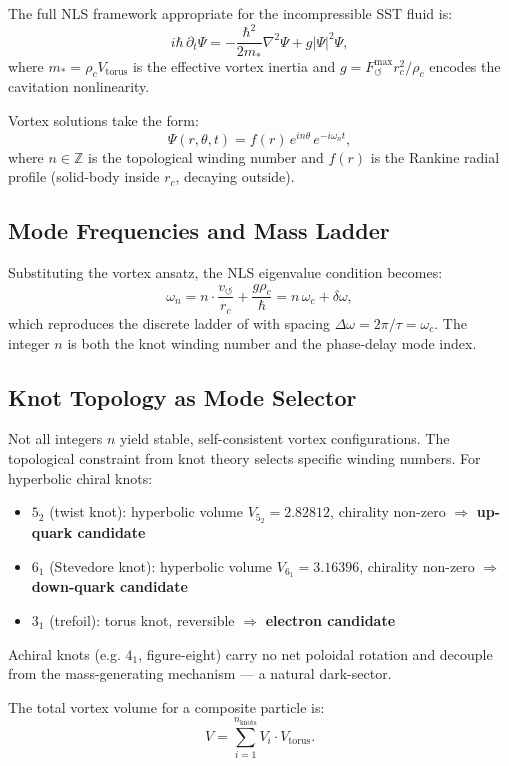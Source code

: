 \documentclass[11pt,a4paper]{article}
\begin{document}
The full NLS framework appropriate for the incompressible SST fluid is:
\[
  i\hbar\,\partial_t\Psi
  = -\frac{\hbar^2}{2m_*}\nabla^2\Psi + g|\Psi|^2\Psi,
\]
where $m_* = \rho_c V_\text{torus}$ is the effective vortex inertia and
$g = F_{\circlearrowleft}^{\max} r_c^2 / \rho_c$ encodes the cavitation nonlinearity.

Vortex solutions take the form:
\[
  \Psi(r,\theta,t) = f(r)\,e^{in\theta}\,e^{-i\omega_n t},
\]
where $n \in \mathbb{Z}$ is the topological winding number and $f(r)$ is the
Rankine radial profile (solid-body inside $r_c$, decaying outside).

\subsection{Mode Frequencies and Mass Ladder}

Substituting the vortex ansatz, the NLS eigenvalue condition becomes:
\[
  \omega_n = n\cdot\frac{v_{\circlearrowleft}}{r_c} + \frac{g\rho_c}{\hbar}
  = n\,\omega_c + \delta\omega, \label{eq:ladder}
\]
which reproduces the discrete ladder of \cite{Iskandarani2026AIP} with spacing
$\Delta\omega = 2\pi/\tau = \omega_c$. The integer $n$ is both the knot winding
number and the phase-delay mode index.

\subsection{Knot Topology as Mode Selector}

Not all integers $n$ yield stable, self-consistent vortex configurations. The
topological constraint from knot theory selects specific winding numbers. For
hyperbolic chiral knots:
\begin{itemize}
  \item $5_2$ (twist knot): hyperbolic volume $V_{5_2} = 2.82812$,
        chirality non-zero $\Rightarrow$ \textbf{up-quark candidate}
  \item $6_1$ (Stevedore knot): hyperbolic volume $V_{6_1} = 3.16396$,
        chirality non-zero $\Rightarrow$ \textbf{down-quark candidate}
  \item $3_1$ (trefoil): torus knot, reversible $\Rightarrow$ \textbf{electron candidate}
\end{itemize}
Achiral knots (e.g. $4_1$, figure-eight) carry no net poloidal rotation and decouple
from the mass-generating mechanism --- a natural dark-sector.

The total vortex volume for a composite particle is:
\[
  V = \sum_{i=1}^{n_\text{knots}} V_i \cdot V_\text{torus}.
\]
\end{document}
